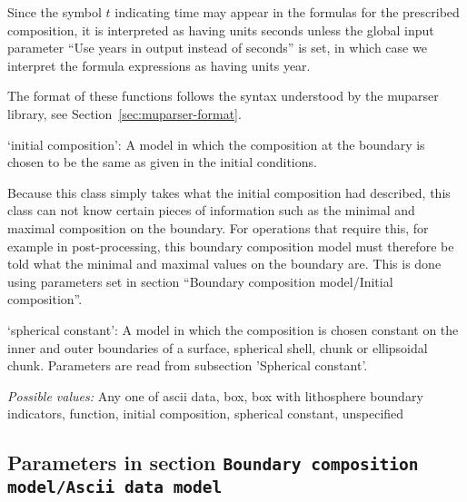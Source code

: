 \begin{itemize}
Since the symbol $t$ indicating time may appear in the formulas for the prescribed composition, it is interpreted as having units seconds unless the global input parameter ``Use years in output instead of seconds'' is set, in which case we interpret the formula expressions as having units year.

The format of these functions follows the syntax understood by the muparser library, see Section~\ref{sec:muparser-format}.

`initial composition': A model in which the composition at the boundary is chosen to be the same as given in the initial conditions.

Because this class simply takes what the initial composition had described, this class can not know certain pieces of information such as the minimal and maximal composition on the boundary. For operations that require this, for example in post-processing, this boundary composition model must therefore be told what the minimal and maximal values on the boundary are. This is done using parameters set in section ``Boundary composition model/Initial composition''.

`spherical constant': A model in which the composition is chosen constant on the inner and outer boundaries of a surface, spherical shell, chunk or ellipsoidal chunk. Parameters are read from subsection 'Spherical constant'.


{\it Possible values:} Any one of ascii data, box, box with lithosphere boundary indicators, function, initial composition, spherical constant, unspecified
\end{itemize}



\subsection{Parameters in section \tt Boundary composition model/Ascii data model}
\label{parameters:Boundary_20composition_20model/Ascii_20data_20model}

